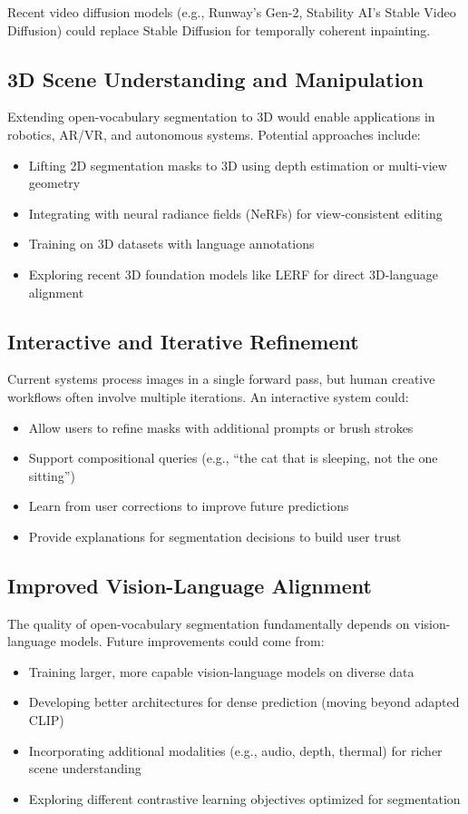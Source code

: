 Recent video diffusion models (e.g., Runway's Gen-2, Stability AI's Stable Video Diffusion) could replace Stable Diffusion for temporally coherent inpainting.

\subsection{3D Scene Understanding and Manipulation}

Extending open-vocabulary segmentation to 3D would enable applications in robotics, AR/VR, and autonomous systems. Potential approaches include:
\begin{itemize}
    \item Lifting 2D segmentation masks to 3D using depth estimation or multi-view geometry
    \item Integrating with neural radiance fields (NeRFs) for view-consistent editing
    \item Training on 3D datasets with language annotations
    \item Exploring recent 3D foundation models like LERF \cite{lerf2023} for direct 3D-language alignment
\end{itemize}

\subsection{Interactive and Iterative Refinement}

Current systems process images in a single forward pass, but human creative workflows often involve multiple iterations. An interactive system could:
\begin{itemize}
    \item Allow users to refine masks with additional prompts or brush strokes
    \item Support compositional queries (e.g., ``the cat that is sleeping, not the one sitting'')
    \item Learn from user corrections to improve future predictions
    \item Provide explanations for segmentation decisions to build user trust
\end{itemize}

\subsection{Improved Vision-Language Alignment}

The quality of open-vocabulary segmentation fundamentally depends on vision-language models. Future improvements could come from:
\begin{itemize}
    \item Training larger, more capable vision-language models on diverse data
    \item Developing better architectures for dense prediction (moving beyond adapted CLIP)
    \item Incorporating additional modalities (e.g., audio, depth, thermal) for richer scene understanding
    \item Exploring different contrastive learning objectives optimized for segmentation
\end{itemize}

